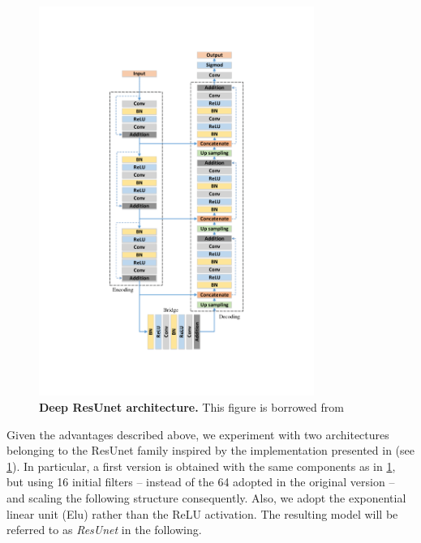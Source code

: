 \begin{figure}
\centerline{
\includegraphics[width=0.8\textwidth]{figures/130_methods/resunet.pdf}
}
\caption{\textbf{Deep ResUnet architecture.}
This figure is borrowed from \protect \cite{deep_resunet}
} \label{fig:resunet_architecture}
\end{figure}
Given the advantages described above, we experiment with two architectures belonging to the ResUnet family inspired by the implementation presented in  (see \cref{fig:resunet_architecture}).
In particular, a first version is obtained with the same components as in \cref{fig:resunet_architecture}, but using 16 initial filters -- instead of the 64 adopted in the original version \cite{deep_resunet} -- and scaling the following structure consequently.
Also, we adopt the exponential linear unit (Elu) \cite{clevert2015elu} rather than the ReLU activation.
The resulting model will be referred to as \textit{ResUnet} in the following.

